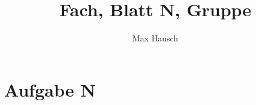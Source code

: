 \documentclass[12pt,pdftex,a4paper]{article}
\begin{document}
\title{\textbf{Fach, Blatt N, Gruppe} }
\author{Max Hausch}

\maketitle
\renewcommand{\labelenumi}{\alph{enumi})}

\section*{Aufgabe N}
\begin{enumerate}
\end{enumerate}
\end{document}
